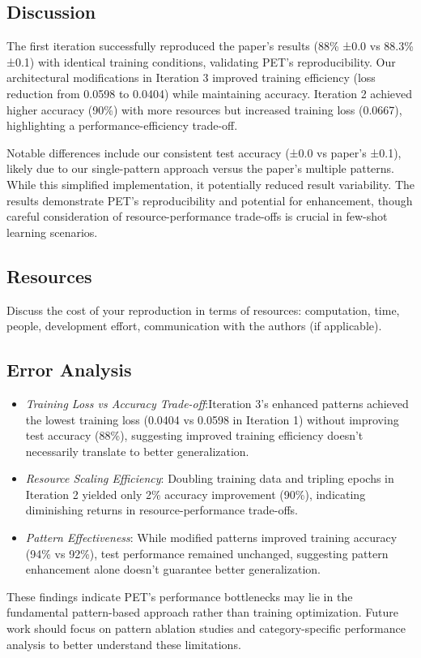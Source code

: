 \documentclass[11pt,a4paper]{article}
\begin{document}
\subsection{Discussion}
The first iteration successfully reproduced the paper's results (88\% ±0.0 vs 88.3\% ±0.1) with identical training conditions, validating PET's reproducibility. Our architectural modifications in Iteration 3 improved training efficiency (loss reduction from 0.0598 to 0.0404) while maintaining accuracy. Iteration 2 achieved higher accuracy (90\%) with more resources but increased training loss (0.0667), highlighting a performance-efficiency trade-off.

Notable differences include our consistent test accuracy (±0.0 vs paper's ±0.1), likely due to our single-pattern approach versus the paper's multiple patterns. While this simplified implementation, it potentially reduced result variability. The results demonstrate PET's reproducibility and potential for enhancement, though careful consideration of resource-performance trade-offs is crucial in few-shot learning scenarios.

\subsection{Resources}
Discuss the cost of your reproduction in terms of resources: computation, time, people, development effort, communication with the authors (if applicable).


\subsection{Error Analysis}
\begin{itemize}[topsep=0pt]
  \item \textit{Training Loss vs Accuracy Trade-off}:Iteration 3's enhanced patterns achieved the lowest training loss (0.0404 vs 0.0598 in Iteration 1) without improving test accuracy (88\%), suggesting improved training efficiency doesn't necessarily translate to better generalization.
  \item \textit{Resource Scaling Efficiency}: Doubling training data and tripling epochs in Iteration 2 yielded only 2\% accuracy improvement (90\%), indicating diminishing returns in resource-performance trade-offs.
  \item \textit{Pattern Effectiveness}: While modified patterns improved training accuracy (94\% vs 92\%), test performance remained unchanged, suggesting pattern enhancement alone doesn't guarantee better generalization.
\end{itemize}
These findings indicate PET's performance bottlenecks may lie in the fundamental pattern-based approach rather than training optimization. Future work should focus on pattern ablation studies and category-specific performance analysis to better understand these limitations.
\end{document}
